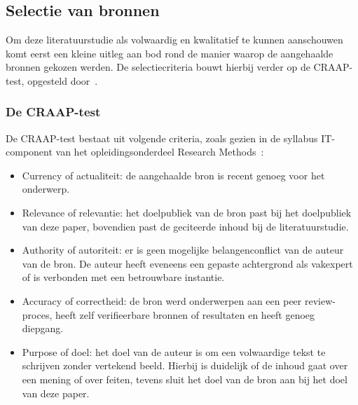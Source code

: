 \chapter{}
\label{ch:stand-van-zaken}



\section{Selectie van bronnen}
\label{sec:selectie-van-bronnen}
Om deze literatuurstudie als volwaardig en kwalitatief te kunnen aanschouwen komt eerst een kleine uitleg aan bod rond de manier waarop de aangehaalde bronnen gekozen werden.
De selectiecriteria bouwt hierbij verder op de CRAAP-test, opgesteld door~\textcite{Blakeslee2004}.

\subsection{De CRAAP-test}
\label{subsec:de-craap-test}
De CRAAP-test bestaat uit volgende criteria, zoals gezien in de syllabus IT-component van het opleidingsonderdeel Research Methods~\autocite{Bert2023}:
\begin{itemize}
    \item Currency of actualiteit: de aangehaalde bron is recent genoeg voor het onderwerp.
    \item Relevance of relevantie: het doelpubliek van de bron past bij het doelpubliek van deze paper, bovendien past de geciteerde inhoud bij de literatuurstudie.
    \item Authority of autoriteit: er is geen mogelijke belangenconflict van de auteur van de bron.
    De auteur heeft eveneens een gepaste achtergrond als vakexpert of is verbonden met een betrouwbare instantie.
    \item Accuracy of correctheid: de bron werd onderwerpen aan een peer review-proces, heeft zelf verifieerbare bronnen of resultaten en heeft genoeg diepgang.
    \item Purpose of doel: het doel van de auteur is om een volwaardige tekst te schrijven zonder vertekend beeld.
    Hierbij is duidelijk of de inhoud gaat over een mening of over feiten, tevens sluit het doel van de bron aan bij het doel van deze paper.
\end{itemize}

